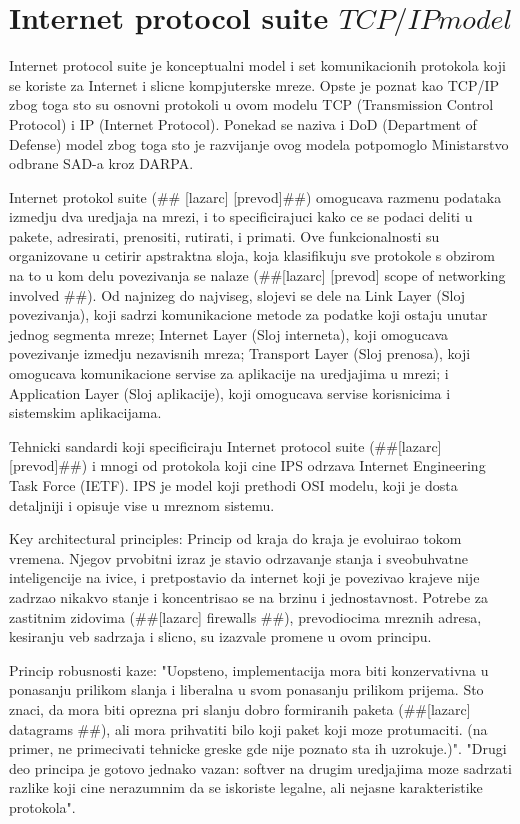 \documentclass[a4paper,12pt, master]{etf}
\begin{document}
	\section{Internet protocol suite \(TCP/IP model\)}
	
	Internet protocol suite je konceptualni model i set komunikacionih protokola koji se 
	koriste za Internet i slicne kompjuterske mreze. Opste je poznat kao TCP/IP zbog toga sto 
	su osnovni protokoli u ovom modelu TCP (Transmission Control Protocol) i IP (Internet 
	Protocol). Ponekad se naziva i DoD (Department of Defense) model zbog toga sto je 
	razvijanje ovog modela potpomoglo Ministarstvo odbrane SAD-a kroz DARPA.

	Internet protokol suite (\#\# [lazarc] [prevod]\#\#) omogucava razmenu podataka izmedju dva
	uredjaja na mrezi, i to specificirajuci kako ce se podaci deliti u pakete, adresirati,
	prenositi, rutirati, i primati. Ove funkcionalnosti su organizovane u cetirir apstraktna 
	sloja, koja klasifikuju sve protokole s obzirom na to u kom delu povezivanja se nalaze 
	(\#\#[lazarc] [prevod] scope of networking involved \#\#). Od najnizeg do najviseg, 
	slojevi se dele na Link	Layer (Sloj povezivanja), koji sadrzi komunikacione metode za 
	podatke koji ostaju unutar jednog segmenta mreze; Internet Layer (Sloj interneta), koji 
	omogucava povezivanje izmedju nezavisnih mreza; Transport Layer (Sloj prenosa), koji 
	omogucava komunikacione servise za aplikacije na uredjajima u mrezi; i Application Layer 
	(Sloj aplikacije), koji omogucava servise korisnicima i	sistemskim aplikacijama.

	Tehnicki sandardi koji specificiraju Internet protocol suite (\#\#[lazarc] [prevod]\#\#) i 
	mnogi od protokola koji cine IPS odrzava Internet Engineering Task Force (IETF). IPS je 
	model koji prethodi OSI modelu, koji je dosta detaljniji i opisuje vise u mreznom sistemu.

	Key architectural principles:
	Princip od kraja do kraja je evoluirao tokom vremena. Njegov prvobitni izraz je stavio 
	odrzavanje stanja i sveobuhvatne inteligencije na ivice, i pretpostavio da internet koji je 
	povezivao krajeve nije zadrzao nikakvo stanje i koncentrisao se na brzinu i jednostavnost. 
	Potrebe za zastitnim zidovima (\#\#[lazarc] firewalls \#\#), prevodiocima mreznih adresa, 
	kesiranju veb sadrzaja i slicno, su izazvale promene u ovom principu.

	Princip robusnosti kaze: "Uopsteno, implementacija mora biti konzervativna u ponasanju 
	prilikom slanja i liberalna u svom ponasanju prilikom prijema. Sto znaci, da mora biti 
	oprezna pri slanju dobro formiranih paketa (\#\#[lazarc] datagrams \#\#), ali mora 
	prihvatiti bilo koji paket koji moze protumaciti. (na primer, ne primecivati tehnicke greske 
	gde nije poznato sta ih uzrokuje.)". "Drugi deo principa je gotovo jednako vazan: softver na 
	drugim uredjajima moze sadrzati razlike koji cine nerazumnim da se iskoriste legalne, ali 
	nejasne karakteristike protokola".
\end{document}
